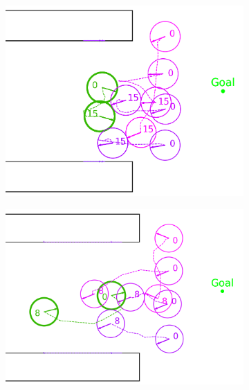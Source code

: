\documentclass[letterpaper, 10 pt, conference]{ieeeconf}  %
\begin{document}
	\begin{figure}
		\centering
		\begin{subfigure}[t]{0.49\linewidth}
			\centering
			\includegraphics[width=\linewidth]{failure_without_failure_controller}
			\caption{}
		\end{subfigure}
		\begin{subfigure}[t]{0.49\linewidth}
			\centering
			\includegraphics[width=\linewidth]{failure_with_failure_controller}
			\caption{}
		\end{subfigure}
	\end{figure}
\end{document}
